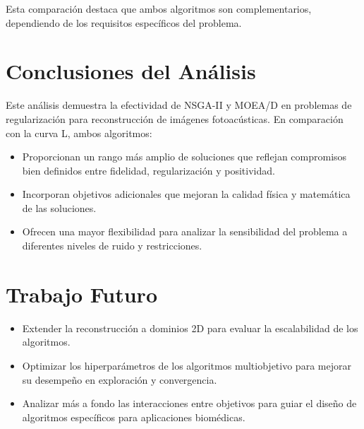 Esta comparación destaca que ambos algoritmos son complementarios, dependiendo de los requisitos específicos del problema.

\section{Conclusiones del Análisis} \label{sec:analysis:conclusions}

Este análisis demuestra la efectividad de NSGA-II y MOEA/D en problemas de regularización para reconstrucción de imágenes fotoacústicas. En comparación con la curva L, ambos algoritmos:
\begin{itemize}
    \item Proporcionan un rango más amplio de soluciones que reflejan compromisos bien definidos entre fidelidad, regularización y positividad.
    \item Incorporan objetivos adicionales que mejoran la calidad física y matemática de las soluciones.
    \item Ofrecen una mayor flexibilidad para analizar la sensibilidad del problema a diferentes niveles de ruido y restricciones.
\end{itemize}

\section{Trabajo Futuro} \label{sec:analysis:future}
\begin{itemize}
    \item Extender la reconstrucción a dominios 2D para evaluar la escalabilidad de los algoritmos.
    \item Optimizar los hiperparámetros de los algoritmos multiobjetivo para mejorar su desempeño en exploración y convergencia.
    \item Analizar más a fondo las interacciones entre objetivos para guiar el diseño de algoritmos específicos para aplicaciones biomédicas.
\end{itemize}
